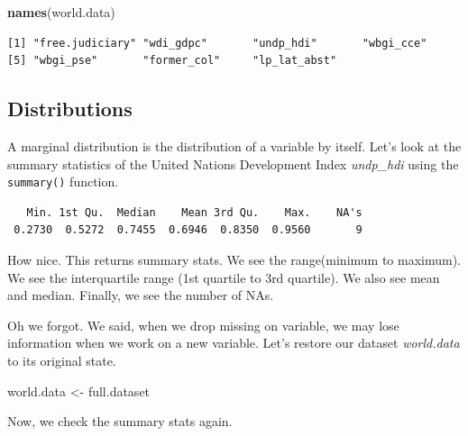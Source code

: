 \documentclass[]{book}
\newenvironment{Shaded}{\begin{snugshade}}{\end{snugshade}}
\newcommand{\KeywordTok}[1]{\textcolor[rgb]{0.13,0.29,0.53}{\textbf{#1}}}
\newcommand{\StringTok}[1]{\textcolor[rgb]{0.31,0.60,0.02}{#1}}
\newcommand{\OperatorTok}[1]{\textcolor[rgb]{0.81,0.36,0.00}{\textbf{#1}}}
\newcommand{\NormalTok}[1]{#1}
\theoremstyle{definition}
\theoremstyle{definition}
\theoremstyle{definition}
\theoremstyle{remark}
\begin{document}
\begin{Shaded}
\begin{Highlighting}[]
\KeywordTok{names}\NormalTok{(world.data)}
\end{Highlighting}
\end{Shaded}

\begin{verbatim}
[1] "free.judiciary" "wdi_gdpc"       "undp_hdi"       "wbgi_cce"      
[5] "wbgi_pse"       "former_col"     "lp_lat_abst"   
\end{verbatim}

\subsection{Distributions}\label{distributions}

A marginal distribution is the distribution of a variable by itself.
Let's look at the summary statistics of the United Nations Development
Index \emph{undp\_hdi} using the \texttt{summary()} function.

\begin{Shaded}
\end{Shaded}

\begin{verbatim}
   Min. 1st Qu.  Median    Mean 3rd Qu.    Max.    NA's 
 0.2730  0.5272  0.7455  0.6946  0.8350  0.9560       9 
\end{verbatim}

How nice. This returns summary stats. We see the range(minimum to
maximum). We see the interquartile range (1st quartile to 3rd quartile).
We also see mean and median. Finally, we see the number of NAs.

Oh we forgot. We said, when we drop missing on variable, we may lose
information when we work on a new variable. Let's restore our dataset
\emph{world.data} to its original state.

\begin{Shaded}
\begin{Highlighting}[]
\NormalTok{world.data <-}\StringTok{ }\NormalTok{full.dataset}
\end{Highlighting}
\end{Shaded}

Now, we check the summary stats again.

\begin{Shaded}
\end{Shaded}
\end{document}
